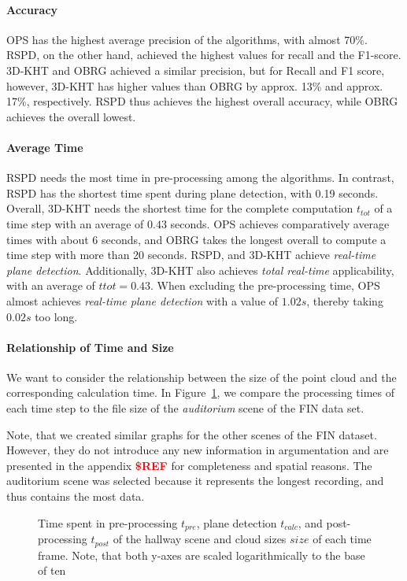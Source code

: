 \documentclass[main.tex]{subfiles}
\begin{document}
\paragraph{Accuracy}
OPS has the highest average precision of the algorithms, with almost 70\%. RSPD, on the other hand, achieved the highest values
for recall and the F1-score. 3D-KHT and OBRG achieved a similar precision, but for Recall and F1 score, however, 3D-KHT has
higher values than OBRG by approx. 13\% and approx. 17\%, respectively. RSPD thus achieves the highest overall accuracy,
while OBRG achieves the overall lowest.


\paragraph{Average Time}
RSPD needs the most time in pre-processing among the algorithms. In contrast, RSPD has the shortest time spent
during plane detection, with 0.19 seconds. Overall, 3D-KHT needs the shortest time for the complete computation $t_{tot}$
of a time step with an average of $0.43$ seconds. OPS achieves comparatively average times with about 6 seconds, and OBRG
takes the longest overall to compute a time step with more than 20 seconds.
RSPD, and 3D-KHT achieve \textit{real-time plane detection}. Additionally, 3D-KHT also achieves \textit{total real-time} applicability,
with an average of $t{tot}=0.43$. When excluding the pre-processing time, OPS almost achieves \textit{real-time plane detection} with a
value of $1.02s$, thereby taking $0.02s$ too long.

\paragraph{Relationship of Time and Size}
We want to consider the relationship between the size of the point cloud and the corresponding calculation time.
In Figure~\ref{fig:dynaudi}, we compare the processing times of each time step to the file size of the
\textit{auditorium} scene of the FIN data set.

Note, that we created similar graphs for the other scenes of the FIN dataset.
However, they do not introduce any new information in argumentation and are presented in the appendix \textbf{\textcolor{red}{\$REF}} for completeness
and spatial reasons.
The auditorium scene was selected because it represents the longest recording, and thus contains the most data.

\begin{figure}[H]
    \centering
    \def\svgwidth{\textwidth}
    
    \caption[Time Results Auditorium]{Time spent in pre-processing $t_{pre}$, plane detection $t_{calc}$, and post-processing
        $t_{post}$ of the hallway scene and cloud sizes $size$ of each time frame. Note, that both y-axes are scaled
        logarithmically to the base of ten}
    \label{fig:dynaudi}
\end{figure}
\end{document}
